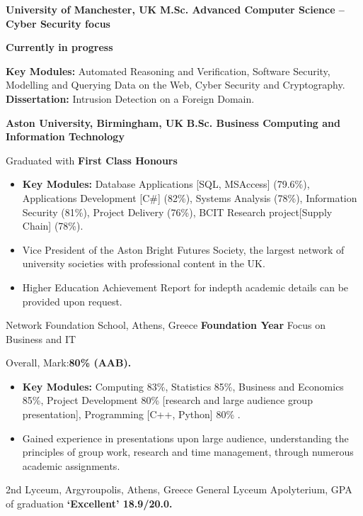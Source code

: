 {\textbf{University of Manchester, UK}}
{\textbf{M.Sc. Advanced Computer Science -- Cyber Security focus}}
{
    \textbf{Currently in progress}

    \textbf{Key Modules:} Automated Reasoning and Verification, Software Security, Modelling and Querying Data on the Web, Cyber Security and Cryptography.
    \\\textbf{Dissertation:} Intrusion Detection on a Foreign Domain.
}

{\textbf{Aston University, Birmingham, UK}}
{\textbf{B.Sc. Business Computing and Information Technology}}
{
    Graduated with \textbf{First Class Honours }
    \begin{itemize}
        \item \textbf{Key Modules:} Database Applications [SQL, MSAccess] (79.6\%), Applications Development [C\#] (82\%), Systems Analysis (78\%), Information Security (81\%), Project Delivery (76\%), BCIT Research project[Supply Chain]  (78\%).
        \item Vice President of the Aston Bright Futures Society, the largest network of university societies with professional content in the UK.
        \item Higher Education Achievement Report for indepth academic details can be provided upon request.
    \end{itemize}
}

{Network Foundation School, Athens, Greece}
{\textbf{Foundation Year} Focus on Business and IT}
{
    Overall, Mark:\textbf{80\% (AAB).}
    \begin{itemize}
        \item \textbf{Key Modules:} Computing 83\%, Statistics 85\%, Business and Economics 85\%, Project Development 80\% [research and large audience group presentation], Programming [C++, Python] 80\% .
        \item Gained experience in presentations upon large audience, understanding the principles of group work, research and time management, through numerous academic assignments.
    \end{itemize}
}

{}
{2nd Lyceum, Argyroupolis, Athens, Greece}
{General Lyceum Apolyterium, GPA of graduation \textbf{‘Excellent’ 18.9/20.0.}}
